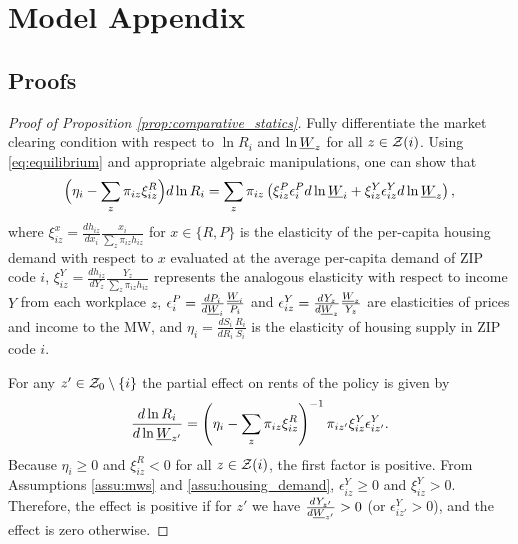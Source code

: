 
\section{Model Appendix}

\subsection{Proofs}\label{sec:proofs}

\begin{proof}[Proof of Proposition \ref{prop:comparative_statics}]
    Fully differentiate the market clearing condition with respect to $\ln R_i$ 
    and $\ln \underline{W}_z$ for all $z\in\mathcal{Z}(i)$.
    Using \eqref{eq:equilibrium} and appropriate algebraic manipulations, 
    one can show that
    \begin{equation}\label{eq:diff_equilibrium}
        \Big(\eta_i - \sum_z \pi_{iz} \xi^R_{iz} \Big) d \ln R_i
        = 
        \sum_z \pi_{iz} \left(\xi^P_{iz} \epsilon_{i}^P d \ln \underline{W}_i 
                            + \xi^Y_{iz} \epsilon_{iz}^Y d \ln \underline{W}_z \right) ,
    \end{equation}
    where
    $\xi_{iz}^x = \frac{d h_{iz}}{d x_i} \frac{x_i}{\sum_z \pi_{iz} h_{iz}}$ for
    $x\in\{R,P\}$ is the elasticity of the per-capita housing demand with respect
    to $x$ evaluated at the average per-capita demand of ZIP code $i$,
    $\xi_{iz}^Y = \frac{d h_{iz}}{d Y_z} \frac{Y_z}{\sum_z \pi_{iz} h_{iz}}$ 
    represents the analogous elasticity with respect to income $Y$ from each 
    workplace $z$,
    $\epsilon_{i}^P = \frac{d P_i}{d \underline{W}_i} \frac{\underline{W}_i}{P_i}$ and 
    $\epsilon_{iz}^Y = \frac{d Y_z}{d \underline{W}_z} \frac{\underline{W}_z}{Y_z}$ are
    elasticities of prices and income to the MW, and
    $\eta_i = \frac{d S_i}{d R_i} \frac{R_i}{S_i}$ is the elasticity 
    of housing supply in ZIP code $i$.

    For any $z'\in\mathcal{Z}_0\setminus\{i\}$ the partial effect on rents of the policy
    is given by
    $$
    \frac{d\ln R_i}{d\ln\underline{W}_{z'}} 
      = \left(\eta_i - \sum_z \pi_{iz} \xi^R_{iz}\right)^{-1} 
              \pi_{iz'}\xi^Y_{iz}\epsilon_{iz'}^Y.
    $$
    Because $\eta_i\geq0$ and $\xi^R_{iz} < 0$ for all $z\in\mathcal{Z}(i)$, 
    the first factor is positive.
    From Assumptions \ref{assu:mws} and \ref{assu:housing_demand},
    $\epsilon_{iz}^Y\geq0$ and $\xi^Y_{iz}>0$.
    Therefore, the effect is positive if for $z'$ we have 
    $\frac{d Y_{z'}}{d \underline{W}_{z'}}>0$ (or $\epsilon_{iz'}^Y>0$), 
    and the effect is zero otherwise.


\end{proof}
